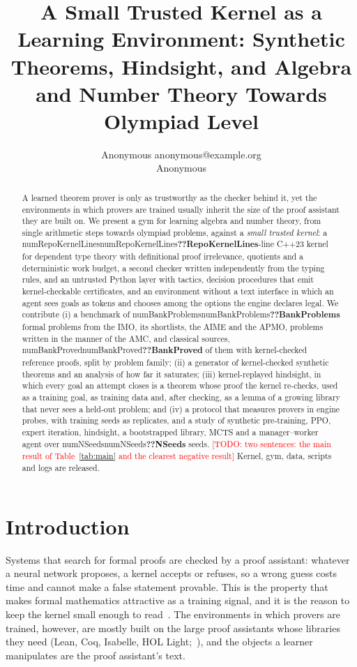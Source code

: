 \documentclass[10pt]{article}
\title{A Small Trusted Kernel as a Learning Environment: Synthetic Theorems, Hindsight, and Algebra and Number Theory Towards Olympiad Level}
\author{\name Anonymous \email anonymous@example.org \\ \addr Anonymous}                              %
\newcommand{\N}[1]{\ifcsname num#1\endcsname\csname num#1\endcsname\else\textbf{??#1}\fi}          %
\newcommand{\todo}[1]{\textcolor{red}{[TODO: #1]}}                                                    %
\begin{document}
\maketitle

\begin{abstract}
A learned theorem prover is only as trustworthy as the checker behind it, yet the environments in which provers are trained usually inherit the size of the proof assistant they are built on.
We present a gym for learning algebra and number theory, from single arithmetic steps towards olympiad problems, against a \emph{small trusted kernel}: a \N{RepoKernelLines}-line C++23 kernel for dependent type theory with definitional proof irrelevance, quotients and a deterministic work budget, a second checker written independently from the typing rules, and an untrusted Python layer with tactics, decision procedures that emit kernel-checkable certificates, and an environment without a text interface in which an agent sees goals as tokens and chooses among the options the engine declares legal.
We contribute (i) a benchmark of \N{BankProblems} formal problems from the IMO, its shortlists, the AIME and the APMO, problems written in the manner of the AMC, and classical sources, \N{BankProved} of them with kernel-checked reference proofs, split by problem family; (ii) a generator of kernel-checked synthetic theorems and an analysis of how far it saturates; (iii) kernel-replayed hindsight, in which every goal an attempt closes is a theorem whose proof the kernel re-checks, used as a training goal, as training data and, after checking, as a lemma of a growing library that never sees a held-out problem; and (iv) a protocol that measures provers in engine probes, with training seeds as replicates, and a study of synthetic pre-training, PPO, expert iteration, hindsight, a bootstrapped library, MCTS and a manager--worker agent over \N{NSeeds} seeds.
\todo{two sentences: the main result of Table~\ref{tab:main} and the clearest negative result}
Kernel, gym, data, scripts and logs are released.
\end{abstract}

\section{Introduction}\label{sec:intro}

Systems that search for formal proofs are checked by a proof assistant: whatever a neural network proposes, a kernel accepts or refuses, so a wrong guess costs time and cannot make a false statement provable.
This is the property that makes formal mathematics attractive as a training signal, and it is the reason to keep the kernel small enough to read~\citep{pollack1998believe}.
The environments in which provers are trained, however, are mostly built on the large proof assistants whose libraries they need (Lean, Coq, Isabelle, HOL Light;~\citealp{demoura2015lean,harrison1996hol,nipkow2002isabelle,yang2019coqgym,bansal2019holist,yang2023leandojo}), and the objects a learner manipulates are the proof assistant's text.
\end{document}
